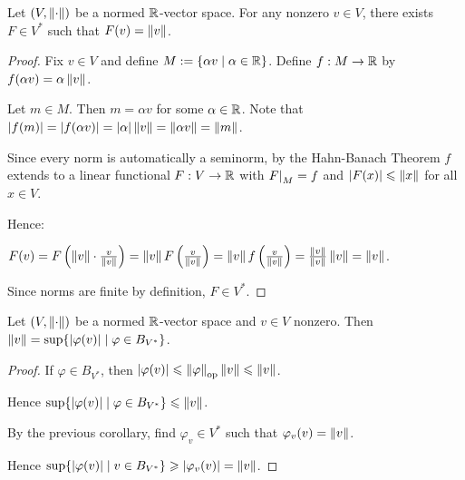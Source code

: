 \documentclass[10pt]{beamer}
\theoremstyle{plain} %
\theoremstyle{remark} %
\begin{document}
\begin{frame}
    \begin{corollary}
        Let $(V,\left\lVert \cdot \right\rVert)$ be a normed $\mathbb{R}$-vector space. For any nonzero $v \in V$, there exists $F \in V^\ast$ such that $F(v) = \left\lVert v \right\rVert$.
    \end{corollary}
        \pause
        \begin{proof}
            Fix $v \in V$ and define $M := \{\alpha v \mid \alpha \in \mathbb{R}\}$. Define $f:M \rightarrow \mathbb{R}$ by $f(\alpha v) = \alpha \left\lVert v \right\rVert$.  \nl
            
            \noindent Let $m \in M$. Then $m = \alpha v$ for some $\alpha \in \mathbb{R}$. Note that $|f(m)| = |f(\alpha v)| = |\alpha| \left\lVert v \right\rVert = \left\lVert \alpha v \right\rVert = \left\lVert m \right\rVert$. \nl
            
            \noindent Since every norm is automatically a seminorm, by the Hahn-Banach Theorem $f$ extends to a linear functional $F:V \rightarrow \mathbb{R}$ with $\restr{F}{M} = f$ and $|F(x)| \leqslant \left\lVert x \right\rVert$ for all $x \in V$. \nl
            
            \noindent Hence:
            
            $F(v) = F \left( \left\lVert v \right\rVert  \cdot \frac{v}{\left\lVert v \right\rVert}\right) = \left\lVert v \right\rVert F\left(\frac{v}{\left\lVert v \right\rVert}\right) = \left\lVert v \right\rVert f\left(\frac{v}{\left\lVert v \right\rVert}\right) = \frac{\left\lVert v \right\rVert}{\left\lVert v \right\rVert}  \left\lVert v \right\rVert = \left\lVert v \right\rVert$. \nl
            
            \noindent Since norms are finite by definition, $F \in V^\ast$.
        \end{proof}
\end{frame}

\begin{frame}
    \begin{corollary}
        Let $(V,\left\lVert \cdot \right\rVert)$ be a normed $\mathbb{R}$-vector space and $v \in V$ nonzero. Then $\left\lVert v \right\rVert = \sup\{|\varphi(v)| \mid \varphi \in B_{V^\ast}\}$.
    \end{corollary}
    \pause
    \begin{proof}
        If $\varphi \in B_{V^\ast}$, then $|\varphi(v)| \leqslant \left\lVert \varphi \right\rVert_{\operatorname{op}} \left\lVert v \right\rVert \leqslant \left\lVert v \right\rVert$. \nl
        
        \noindent Hence $\sup\{|\varphi(v)| \mid \varphi \in B_{V^\ast}\} \leqslant \left\lVert v \right\rVert$. \nl
        
        \noindent By the previous corollary, find $\varphi_v \in V^\ast$ such that $\varphi_v(v) = \left\lVert v \right\rVert$. \nl
        
        \noindent Hence $\sup\{|\varphi(v)| \mid v \in B_{V^\ast}\} \geqslant |\varphi_v(v)| = \left\lVert v \right\rVert$.
    \end{proof}
\end{frame}
\end{document}
